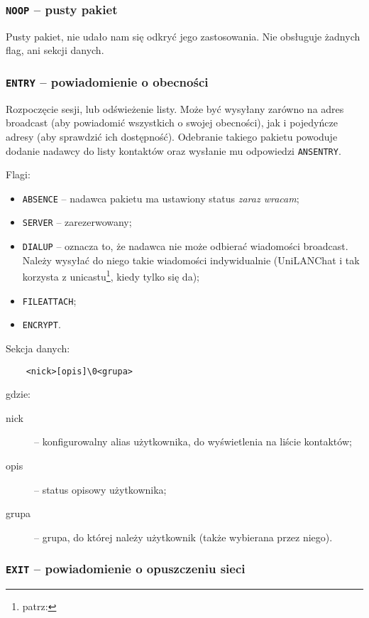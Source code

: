 \documentclass[11pt,leqno]{article}
\begin{document}
\subsubsection{\textnormal{\texttt{NOOP}} -- pusty pakiet}

Pusty pakiet, nie udało nam się odkryć jego zastosowania. Nie obsługuje żadnych flag, ani sekcji
danych.


\subsubsection{\textnormal{\texttt{ENTRY}} -- powiadomienie o obecności}

Rozpoczęcie sesji, lub odświeżenie listy. Może być wysyłany zarówno na adres broadcast (aby
powiadomić wszystkich o swojej obecności), jak i pojedyńcze adresy (aby sprawdzić ich dostępność).
Odebranie takiego pakietu powoduje dodanie nadawcy do listy kontaktów oraz wysłanie mu odpowiedzi
\texttt{ANSENTRY}.

Flagi:
\begin{itemize}
	\item \texttt{ABSENCE} -- nadawca pakietu ma ustawiony status \textit{zaraz wracam};
	\item \texttt{SERVER} -- zarezerwowany;
	\item \texttt{DIALUP} -- oznacza to, że nadawca nie może odbierać wiadomości broadcast.
	Należy wysyłać do niego takie wiadomości indywidualnie (UniLANChat i tak korzysta
	z unicastu\footnote{patrz: }, kiedy tylko się da);
	\item \texttt{FILEATTACH};
	\item \texttt{ENCRYPT}.
\end{itemize}

Sekcja danych:
\begin{verbatim}
	<nick>[opis]\0<grupa>
\end{verbatim}
gdzie:
\begin{description}
	\item[nick] -- konfigurowalny alias użytkownika, do wyświetlenia na liście kontaktów;
	\item[opis] -- status opisowy użytkownika;
	\item[grupa] -- grupa, do której należy użytkownik (także wybierana przez niego).
\end{description}

\subsubsection{\textnormal{\texttt{EXIT}} -- powiadomienie o opuszczeniu sieci}
\end{document}
